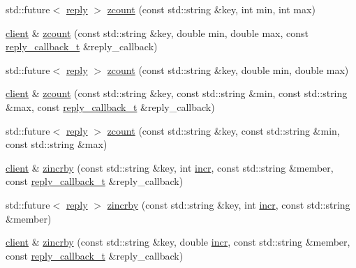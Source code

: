 \begin{DoxyCompactItemize}
\item 
std\+::future$<$ \hyperlink{classcpp__redis_1_1reply}{reply} $>$ \hyperlink{classcpp__redis_1_1client_a7965bc6ab1198ca3bb5b31c10da95c34}{zcount} (const std\+::string \&key, int min, int max)
\item 
\hyperlink{classcpp__redis_1_1client}{client} \& \hyperlink{classcpp__redis_1_1client_a648afc3a38da6413e6b735d2708c3fe3}{zcount} (const std\+::string \&key, double min, double max, const \hyperlink{classcpp__redis_1_1client_a061a1140d36d2eaeda82b09a0bb3f9f2}{reply\+\_\+callback\+\_\+t} \&reply\+\_\+callback)
\item 
std\+::future$<$ \hyperlink{classcpp__redis_1_1reply}{reply} $>$ \hyperlink{classcpp__redis_1_1client_a7d3ddea81b718564c060a51575d8c127}{zcount} (const std\+::string \&key, double min, double max)
\item 
\hyperlink{classcpp__redis_1_1client}{client} \& \hyperlink{classcpp__redis_1_1client_a4638b70036c17ddd87dc204392ea7718}{zcount} (const std\+::string \&key, const std\+::string \&min, const std\+::string \&max, const \hyperlink{classcpp__redis_1_1client_a061a1140d36d2eaeda82b09a0bb3f9f2}{reply\+\_\+callback\+\_\+t} \&reply\+\_\+callback)
\item 
std\+::future$<$ \hyperlink{classcpp__redis_1_1reply}{reply} $>$ \hyperlink{classcpp__redis_1_1client_a94416b729f3ecd32d41450725e773590}{zcount} (const std\+::string \&key, const std\+::string \&min, const std\+::string \&max)
\item 
\hyperlink{classcpp__redis_1_1client}{client} \& \hyperlink{classcpp__redis_1_1client_a7852309fc3054c1bce760e4e2189205b}{zincrby} (const std\+::string \&key, int \hyperlink{classcpp__redis_1_1client_a2f9ba6c7e83451207403096b19da4faa}{incr}, const std\+::string \&member, const \hyperlink{classcpp__redis_1_1client_a061a1140d36d2eaeda82b09a0bb3f9f2}{reply\+\_\+callback\+\_\+t} \&reply\+\_\+callback)
\item 
std\+::future$<$ \hyperlink{classcpp__redis_1_1reply}{reply} $>$ \hyperlink{classcpp__redis_1_1client_ada07e0534d23fd0247cdc1b9a8008fe9}{zincrby} (const std\+::string \&key, int \hyperlink{classcpp__redis_1_1client_a2f9ba6c7e83451207403096b19da4faa}{incr}, const std\+::string \&member)
\item 
\hyperlink{classcpp__redis_1_1client}{client} \& \hyperlink{classcpp__redis_1_1client_abeb105281afc762ed57afce5619ef73f}{zincrby} (const std\+::string \&key, double \hyperlink{classcpp__redis_1_1client_a2f9ba6c7e83451207403096b19da4faa}{incr}, const std\+::string \&member, const \hyperlink{classcpp__redis_1_1client_a061a1140d36d2eaeda82b09a0bb3f9f2}{reply\+\_\+callback\+\_\+t} \&reply\+\_\+callback)

\end{DoxyCompactItemize}
